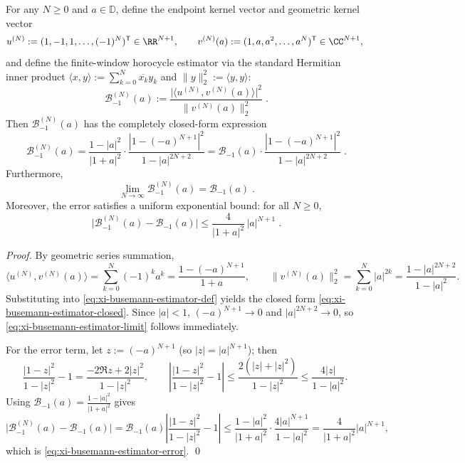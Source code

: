 \begin{theorem}\label{thm:xi-busemann-depth-finite-window-estimator}
For any \(N\ge 0\) and \(a\in\mathbb{D}\), define the endpoint kernel vector and geometric kernel vector
\[
u^{(N)}:=(1,-1,1,\dots,(-1)^N)^{\mathsf T}\in\RR^{N+1},
\qquad
v^{(N)}(a):=(1,a,a^2,\dots,a^N)^{\mathsf T}\in\CC^{N+1},
\]
and define the finite-window horocycle estimator via the standard Hermitian inner product \(\langle x,y\rangle:=\sum_{k=0}^{N}\overline{x_k}y_k\) and \(\|y\|_2^2:=\langle y,y\rangle\):
\begin{equation}\label{eq:xi-busemann-estimator-def}
\boxed{\;
\mathcal{B}^{(N)}_{-1}(a):=\frac{\bigl|\langle u^{(N)},v^{(N)}(a)\rangle\bigr|^2}{\|v^{(N)}(a)\|_2^2}\; }.
\end{equation}
Then \(\mathcal{B}^{(N)}_{-1}(a)\) has the completely closed-form expression
\begin{equation}\label{eq:xi-busemann-estimator-closed}
\boxed{\;
\mathcal{B}^{(N)}_{-1}(a)
=\frac{1-|a|^2}{|1+a|^2}\cdot\frac{|1-(-a)^{N+1}|^2}{1-|a|^{2N+2}}
=\mathcal{B}_{-1}(a)\cdot\frac{|1-(-a)^{N+1}|^2}{1-|a|^{2N+2}}\; }.
\end{equation}
Furthermore,
\begin{equation}\label{eq:xi-busemann-estimator-limit}
\boxed{\;
\lim_{N\to\infty}\mathcal{B}^{(N)}_{-1}(a)=\mathcal{B}_{-1}(a)\; }.
\end{equation}
Moreover, the error satisfies a uniform exponential bound: for all \(N\ge 0\),
\begin{equation}\label{eq:xi-busemann-estimator-error}
\boxed{\;
\bigl|\mathcal{B}^{(N)}_{-1}(a)-\mathcal{B}_{-1}(a)\bigr|
\le \frac{4}{|1+a|^2}\,|a|^{N+1}\; }.
\end{equation}
\end{theorem}

\begin{proof}
By geometric series summation,
\[
\langle u^{(N)},v^{(N)}(a)\rangle=\sum_{k=0}^{N}(-1)^k a^k=\frac{1-(-a)^{N+1}}{1+a},
\qquad
\|v^{(N)}(a)\|_2^2=\sum_{k=0}^{N}|a|^{2k}=\frac{1-|a|^{2N+2}}{1-|a|^{2}}.
\]
Substituting into \eqref{eq:xi-busemann-estimator-def} yields the closed form \eqref{eq:xi-busemann-estimator-closed}.
Since \(|a|<1\), \((-a)^{N+1}\to 0\) and \(|a|^{2N+2}\to 0\), so \eqref{eq:xi-busemann-estimator-limit} follows immediately.
\par
For the error term, let \(z:=(-a)^{N+1}\) (so \(|z|=|a|^{N+1}\)); then
\[
\frac{|1-z|^2}{1-|z|^2}-1
=\frac{-2\Re z+2|z|^2}{1-|z|^2},
\qquad
\left|\frac{|1-z|^2}{1-|z|^2}-1\right|
\le \frac{2(|z|+|z|^2)}{1-|z|^2}
\le \frac{4|z|}{1-|a|^2}.
\]
Using \(\mathcal{B}_{-1}(a)=\frac{1-|a|^2}{|1+a|^2}\) gives
\[
\bigl|\mathcal{B}^{(N)}_{-1}(a)-\mathcal{B}_{-1}(a)\bigr|
=\mathcal{B}_{-1}(a)\left|\frac{|1-z|^2}{1-|z|^2}-1\right|
\le \frac{1-|a|^2}{|1+a|^2}\cdot \frac{4|a|^{N+1}}{1-|a|^2}
=\frac{4}{|1+a|^2}|a|^{N+1},
\]
which is \eqref{eq:xi-busemann-estimator-error}. \qed
\end{proof}

